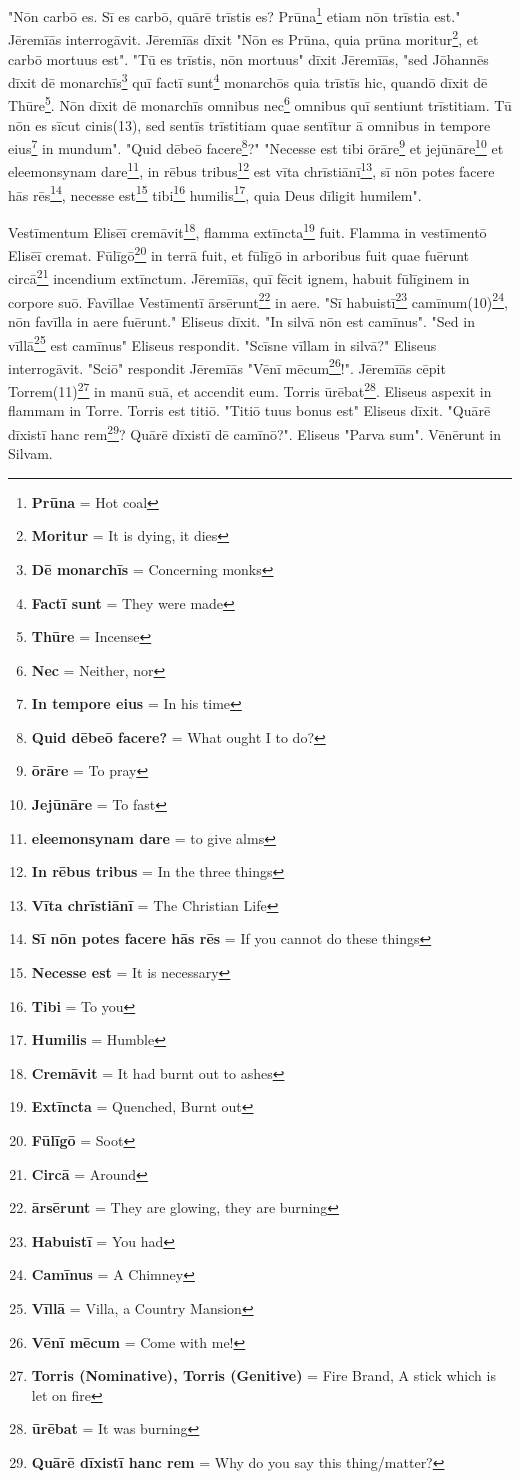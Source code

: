 "Nōn carbō es. Sī es carbō, quārē trīstis es? Prūna\footnote{\textbf{Prūna} = Hot coal} etiam nōn trīstia est." Jēremīās interrogāvit. Jēremīās dīxit "Nōn es Prūna, quia prūna moritur\footnote{\textbf{Moritur} = It is dying, it dies}, et carbō mortuus est". "Tū es trīstis, nōn mortuus" dīxit Jēremīās, "sed Jōhannēs dīxit dē monarchīs\footnote{\textbf{Dē monarchīs} = Concerning monks} quī factī sunt\footnote{\textbf{Factī sunt} = They were made} monarchōs quia trīstīs hic, quandō dīxit dē Thūre\footnote{\textbf{Thūre} = Incense}. Nōn dīxit dē monarchīs omnibus nec\footnote{\textbf{Nec} = Neither, nor} omnibus quī sentiunt trīstitiam. Tū nōn es sīcut cinis(13), sed sentīs trīstitiam quae sentītur ā omnibus in tempore eius\footnote{\textbf{In tempore eius} = In his time} in mundum". "Quid dēbeō facere\footnote{\textbf{Quid dēbeō facere?} = What ought I to do?}?" "Necesse est tibi ōrāre\footnote{\textbf{ōrāre} = To pray} et jejūnāre\footnote{\textbf{Jejūnāre} = To fast} et eleemonsynam dare\footnote{\textbf{eleemonsynam dare} = to give alms}, in rēbus tribus\footnote{\textbf{In rēbus tribus} = In the three things} est vīta chrīstiānī\footnote{\textbf{Vīta chrīstiānī} = The Christian Life}, sī nōn potes facere hās rēs\footnote{\textbf{Sī nōn potes facere hās rēs} = If you cannot do these things}, necesse est\footnote{\textbf{Necesse est} = It is necessary} tibi\footnote{\textbf{Tibi} = To you} humilis\footnote{\textbf{Humilis} = Humble}, quia Deus dīligit humilem".\par 
Vestīmentum Elisēī cremāvit\footnote{\textbf{Cremāvit} = It had burnt out to ashes}, flamma extīncta\footnote{\textbf{Extīncta} = Quenched, Burnt out} fuit. Flamma in vestīmentō Elisēī cremat. Fūlīgō\footnote{\textbf{Fūlīgō} = Soot} in terrā fuit, et fūlīgō in arboribus fuit quae fuērunt circā\footnote{\textbf{Circā} = Around} incendium extīnctum. Jēremīās, quī fēcit ignem, habuit fūlīginem in corpore suō. Favīllae Vestīmentī ārsērunt\footnote{\textbf{ārsērunt} = They are glowing, they are burning} in aere. "Sī habuistī\footnote{\textbf{Habuistī} = You had} camīnum(10)\footnote{\textbf{Camīnus} = A Chimney}, nōn favīlla in aere fuērunt." Eliseus dīxit. "In silvā nōn est camīnus". "Sed in vīllā\footnote{\textbf{Vīllā} = Villa, a Country Mansion} est camīnus" Eliseus respondit. "Scīsne vīllam in silvā?" Eliseus interrogāvit. "Sciō" respondit Jēremīās "Vēnī mēcum\footnote{\textbf{Vēnī mēcum} = Come with me!}!". Jēremīās cēpit Torrem(11)\footnote{\textbf{Torris (Nominative), Torris (Genitive)} = Fire Brand, A stick which is let on fire} in manū suā, et accendit eum. Torris ūrēbat\footnote{\textbf{ūrēbat} = It was burning}. Eliseus aspexit in flammam in Torre. Torris est titiō. "Titiō tuus bonus est" Eliseus dīxit. "Quārē dīxistī hanc rem\footnote{\textbf{Quārē dīxistī hanc rem} = Why do you say this thing/matter?}? Quārē dīxistī dē camīnō?". Eliseus "Parva sum". Vēnērunt in Silvam. 

